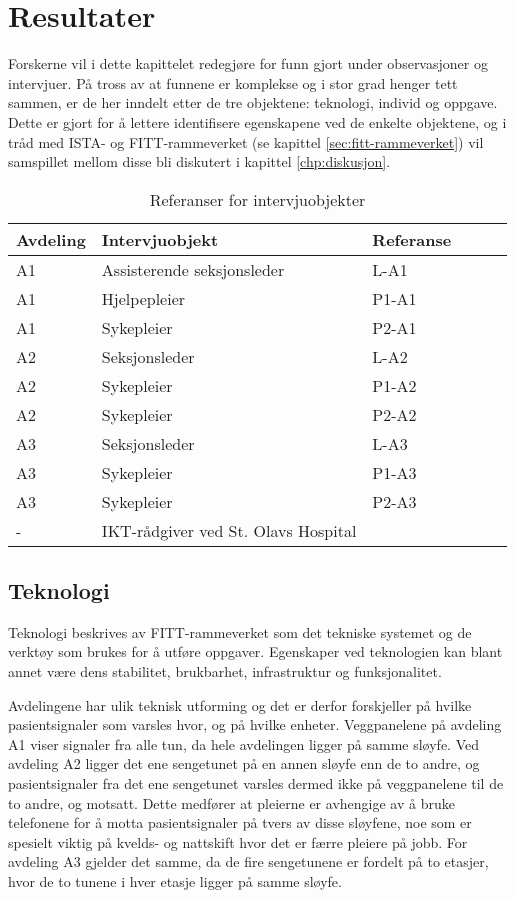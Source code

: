 \chapter{Resultater}
\label{chp:resultater} 

Forskerne vil i dette kapittelet redegjøre for funn gjort under observasjoner og intervjuer. På tross av at funnene er komplekse og i stor grad henger tett sammen, er de her inndelt etter de tre objektene: teknologi, individ og oppgave. Dette er gjort for å lettere identifisere egenskapene ved de enkelte objektene, og i tråd med ISTA- og FITT-rammeverket (se kapittel \ref{sec:fitt-rammeverket}) vil samspillet mellom disse bli diskutert i kapittel \ref{chp:diskusjon}.

\begin{table}[H]\centering
    \begin{tabular}{ |l|l|l|l|l|l| }
    \hline
    Avdeling & Intervjuobjekt & Referanse \\ \hline
       A1 & Assisterende seksjonsleder & L-A1 \\ \hline
       A1 & Hjelpepleier & P1-A1 \\ \hline
       A1 & Sykepleier & P2-A1 \\ \hline
       A2 & Seksjonsleder & L-A2 \\ \hline
       A2 & Sykepleier & P1-A2 \\ \hline
       A2 & Sykepleier & P2-A2 \\ \hline
       A3 & Seksjonsleder & L-A3 \\ \hline
       A3 & Sykepleier & P1-A3 \\ \hline
       A3 & Sykepleier & P2-A3 \\ \hline
       - & IKT-rådgiver ved St. Olavs Hospital &  \\ \hline
    \end{tabular}
    \caption {Referanser for intervjuobjekter}
    \label{referanserintervju}
\end{table}

\section{Teknologi}
Teknologi beskrives av FITT-rammeverket som det tekniske systemet og de verktøy som brukes for å utføre oppgaver. Egenskaper ved teknologien kan blant annet være dens stabilitet, brukbarhet, infrastruktur og funksjonalitet. 

\noindent
Avdelingene har ulik teknisk utforming og det er derfor forskjeller på hvilke pasientsignaler som varsles hvor, og på hvilke enheter. Veggpanelene på avdeling A1 viser signaler fra alle tun, da hele avdelingen ligger på samme sløyfe. Ved avdeling A2 ligger det ene sengetunet på en annen sløyfe enn de to andre, og pasientsignaler fra det ene sengetunet varsles dermed ikke på veggpanelene til de to andre, og motsatt. Dette medfører at pleierne er avhengige av å bruke telefonene for å motta pasientsignaler på tvers av disse sløyfene, noe som er spesielt viktig på kvelds- og nattskift hvor det er færre pleiere på jobb. For avdeling A3 gjelder det samme, da de fire sengetunene er fordelt på to etasjer, hvor de to tunene i hver etasje ligger på samme sløyfe.

